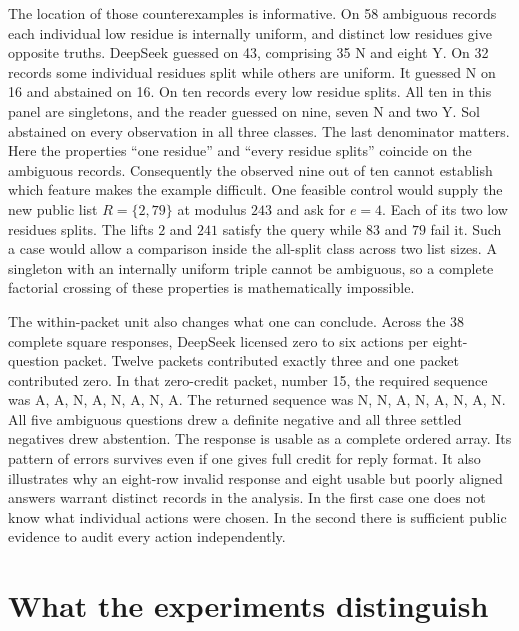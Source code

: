 \documentclass[12pt,letterpaper]{article}
\begin{document}
The location of those counterexamples is informative. On 58 ambiguous records each individual low residue is internally uniform, and distinct low residues give opposite truths. DeepSeek guessed on 43, comprising 35 N and eight Y. On 32 records some individual residues split while others are uniform. It guessed N on 16 and abstained on 16. On ten records every low residue splits. All ten in this panel are singletons, and the reader guessed on nine, seven N and two Y. Sol abstained on every observation in all three classes. The last denominator matters. Here the properties “one residue” and “every residue splits” coincide on the ambiguous records. Consequently the observed nine out of ten cannot establish which feature makes the example difficult. One feasible control would supply the new public list $R=\{2,79\}$ at modulus $243$ and ask for $e=4$. Each of its two low residues splits. The lifts $2$ and $241$ satisfy the query while $83$ and $79$ fail it. Such a case would allow a comparison inside the all-split class across two list sizes. A singleton with an internally uniform triple cannot be ambiguous, so a complete factorial crossing of these properties is mathematically impossible.

The within-packet unit also changes what one can conclude. Across the 38 complete square responses, DeepSeek licensed zero to six actions per eight-question packet. Twelve packets contributed exactly three and one packet contributed zero. In that zero-credit packet, number 15, the required sequence was A, A, N, A, N, A, N, A. The returned sequence was N, N, A, N, A, N, A, N. All five ambiguous questions drew a definite negative and all three settled negatives drew abstention. The response is usable as a complete ordered array. Its pattern of errors survives even if one gives full credit for reply format. It also illustrates why an eight-row invalid response and eight usable but poorly aligned answers warrant distinct records in the analysis. In the first case one does not know what individual actions were chosen. In the second there is sufficient public evidence to audit every action independently.

\section{What the experiments distinguish}\label{sec:interpret}
\end{document}
